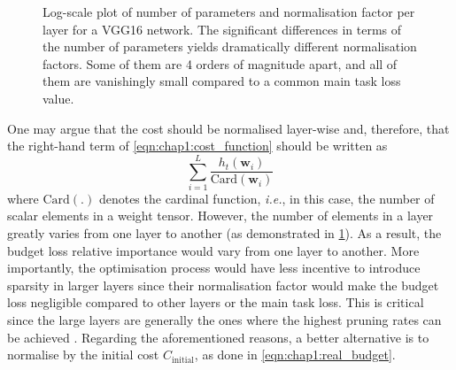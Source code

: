 \begin{figure}
  \centering
    \caption{ Log-scale plot of
      number of parameters and normalisation factor per layer for a VGG16
      network. The significant differences in terms of the number of parameters
      yields dramatically different normalisation factors. Some of them are 4
      orders of magnitude apart, and all of them are vanishingly small compared
      to a common main task loss value.} 
  \label{fig:chap1:vgg16_per_layer_param_and_norm_factor}
\end{figure}

One may argue that the cost should be normalised layer-wise and, therefore,
that the right-hand term of \cref{eqn:chap1:cost_function} should be written as
$$\displaystyle\sum_{i=1}^{L}\frac{h_t(\mathbf{w}_i)}{\text{Card}(\mathbf{w}_i)}$$
where $\text{Card}(.)$ denotes the cardinal function, \textit{i.e.}, in this
case, the number of scalar elements in a weight tensor. However, the number of
elements in a layer greatly varies from one layer to another (as demonstrated in
\cref{fig:chap1:vgg16_per_layer_param_and_norm_factor}). As a result,  the
budget loss relative importance would vary from one layer to another. More
importantly, the optimisation process would have less incentive to introduce
sparsity in larger layers since their normalisation factor would make the budget
loss negligible compared to other layers or the main task loss. This is critical
since the large layers are generally the ones where the highest pruning rates
can be achieved \cite{DBLP:journals/corr/abs-2202-12002}. Regarding the
aforementioned reasons, a better alternative is to normalise by the initial cost
$C_\text{initial}$, as done in \cref{eqn:chap1:real_budget}.\\

